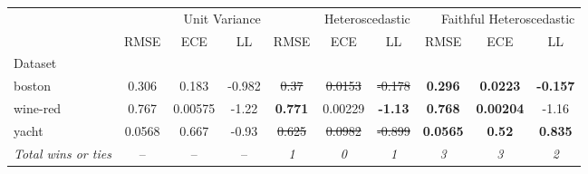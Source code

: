 \begin{tabular}{l|ccc|ccc|ccc}
\toprule
{} & \multicolumn{3}{r}{Unit Variance} & \multicolumn{3}{r}{Heteroscedastic} & \multicolumn{3}{r}{Faithful Heteroscedastic} \\
{} & {RMSE} & {ECE} & {LL} & {RMSE} & {ECE} & {LL} & {RMSE} & {ECE} & {LL} \\
{Dataset} & {} & {} & {} & {} & {} & {} & {} & {} & {} \\
\midrule
boston & 0.306 & 0.183 & -0.982 & \sout{0.37} & \sout{0.0153} & \sout{-0.178} & \textbf{0.296} & \textbf{0.0223} & \textbf{-0.157} \\
wine-red & 0.767 & 0.00575 & -1.22 & \textbf{0.771} & 0.00229 & \textbf{-1.13} & \textbf{0.768} & \textbf{0.00204} & -1.16 \\
yacht & 0.0568 & 0.667 & -0.93 & \sout{0.625} & \sout{0.0982} & \sout{-0.899} & \textbf{0.0565} & \textbf{0.52} & \textbf{0.835} \\
\textit{{Total wins or ties}} & -- & -- & -- & \textit{1} & \textit{0} & \textit{1} & \textit{3} & \textit{3} & \textit{2} \\
\bottomrule
\end{tabular}
